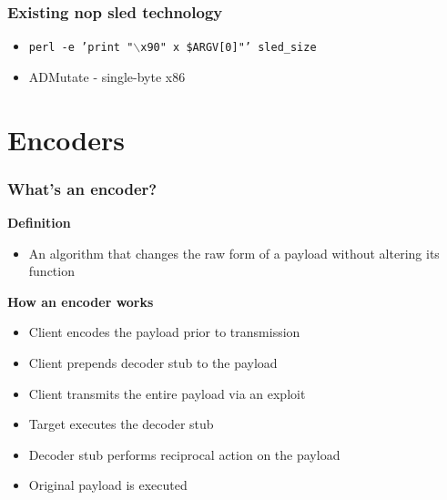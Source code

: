 \documentclass{beamer}
\newenvironment{sitemize}{\vspace{1mm}\begin{itemize}\itemsep 4pt\small}{\end{itemize}}
\begin{document}
\begin{frame}[t]
    \frametitle{Existing nop sled technology}

    \begin{sitemize}
        \item \footnotesize{\texttt{perl -e 'print "$\backslash$x90" x \$ARGV[0]"'
            sled\_size}}
        \item ADMutate - single-byte x86
    \end{sitemize}
\end{frame}

\section{Encoders}


\begin{frame}[t]
    \frametitle{What's an encoder?}

    \textbf{Definition}
    \begin{sitemize}
        \item An algorithm that changes the raw form of a payload
        without altering its function
    \end{sitemize}

    \pause
    \textbf{How an encoder works}
    \begin{sitemize}
        \item<3-> Client encodes the payload prior to transmission
        \item<4-> Client prepends decoder stub to the payload
        \item<5-> Client transmits the entire payload via an exploit
        \item<6-> Target executes the decoder stub
        \item<7-> Decoder stub performs reciprocal action on the payload
        \item<8-> Original payload is executed
    \end{sitemize}
\end{frame}
\end{document}
